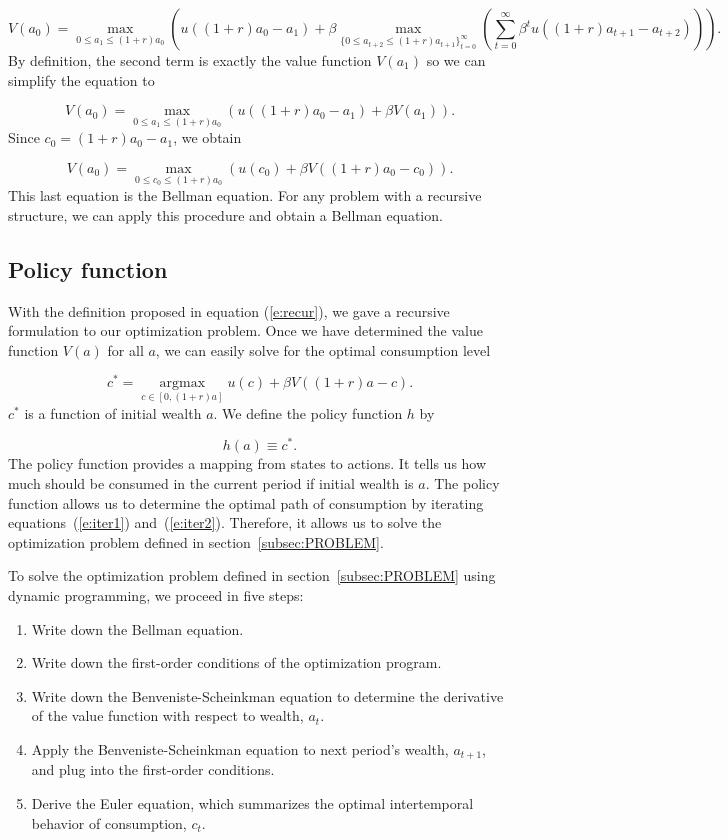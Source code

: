 \documentclass{article}
\begin{document}
\[
V(a_0) = \max_{0\le a_{1}\le (1+r) a_0}\left(u((1+r) a_0-a_1)+\beta\max_{\lbrace 0\le a_{t+2}\le (1+r) a_{t+1}\rbrace _{t=0}^{\infty}}\left(\sum_{t=0}^{\infty}\beta^{t} u((1+r) a_{t+1}-a_{t+2})\right)\right).
\]
By definition, the second term is exactly the value function $V(a_{1})$ so we can simplify the equation to

\[
V(a_0) = \max_{0\le a_{1}\le (1+r) a_0}\left(u((1+r) a_0-a_1)+\beta V(a_1)\right).
\]
Since $c_{0}=(1+r) a_0-a_1$, we obtain

\[
V(a_0) = \max_{0\le c_{0}\le (1+r) a_0}\left(u(c_0)+\beta V((1+r) a_0-c_0)\right).
\]
This last equation is the Bellman equation. For any problem with a recursive structure, we can apply this procedure and obtain a Bellman equation.

\subsection{Policy function}

With the definition proposed in equation (\ref{e:recur}), we gave a recursive formulation to our optimization problem. Once we have determined the value function $V(a)$ for all $a$, we can easily solve for the optimal consumption level

\[
c^*=\operatorname*{argmax}_{c\in[0,(1+r) a]}u(c)+\beta V((1+r) a-c).
\]
$c^*$ is a function of initial wealth $a$. We define the policy function $h$ by

\[
h(a)\equiv c^*.
\]
The policy function provides a mapping from states to actions. It tells us how much should be consumed in the current period if initial wealth is $a$. The policy function allows us to determine the optimal path of consumption by iterating equations~(\ref{e:iter1}) and~(\ref{e:iter2}). Therefore, it allows us to solve the optimization problem defined in section~\ref{subsec:PROBLEM}. 

To solve the optimization problem defined in section~\ref{subsec:PROBLEM} using dynamic programming, we proceed in five steps:
\begin{enumerate}
\item Write down the Bellman equation.
\item Write down the first-order conditions of the optimization program.
\item Write down the Benveniste-Scheinkman equation to determine the derivative of the value function with respect to wealth, $a_{t}$.
\item Apply the Benveniste-Scheinkman equation to next period's wealth, $a_{t+1}$, and plug into the first-order conditions.
\item Derive the Euler equation, which summarizes the optimal intertemporal behavior of consumption, $c_{t}$.
\end{enumerate}
\end{document}
